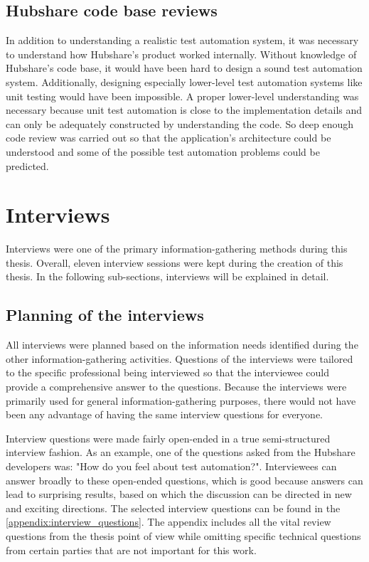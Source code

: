 \subsection{Hubshare code base reviews}
In addition to understanding a realistic test automation system, it was necessary to understand how Hubshare's product worked internally. Without knowledge of Hubshare's code base, it would have been hard to design a sound test automation system. Additionally, designing especially lower-level test automation systems like unit testing would have been impossible. A proper lower-level understanding was necessary because unit test automation is close to the implementation details and can only be adequately constructed by understanding the code. So deep enough code review was carried out so that the application's architecture could be understood and some of the possible test automation problems could be predicted.

\section{Interviews}
Interviews were one of the primary information-gathering methods during this thesis. Overall, eleven interview sessions were kept during the creation of this thesis. In the following sub-sections, interviews will be explained in detail.

\subsection{Planning of the interviews}
All interviews were planned based on the information needs identified during the other information-gathering activities. Questions of the interviews were tailored to the specific professional being interviewed so that the interviewee could provide a comprehensive answer to the questions. Because the interviews were primarily used for general information-gathering purposes, there would not have been any advantage of having the same interview questions for everyone.

Interview questions were made fairly open-ended in a true semi-structured interview fashion. As an example, one of the questions asked from the Hubshare developers was: "How do you feel about test automation?". Interviewees can answer broadly to these open-ended questions, which is good because answers can lead to surprising results, based on which the discussion can be directed in new and exciting directions. The selected interview questions can be found in the \autoref{appendix:interview_questions}. The appendix includes all the vital review questions from the thesis point of view while omitting specific technical questions from certain parties that are not important for this work.

